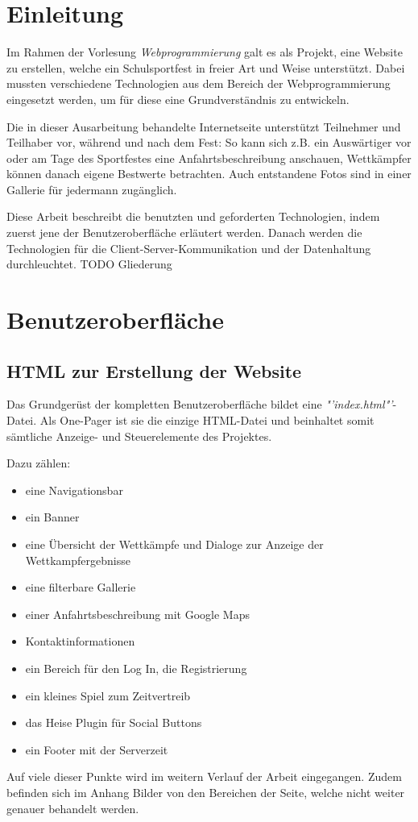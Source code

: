 \chapter{Einleitung}
\label{Einleitung}
Im Rahmen der Vorlesung \textit{Webprogrammierung} galt es als Projekt, eine Website zu erstellen, welche ein Schulsportfest in freier Art und Weise unterstützt. Dabei mussten verschiedene Technologien aus dem Bereich der Webprogrammierung eingesetzt werden, um für diese eine Grundverständnis zu entwickeln.
\par
Die in dieser Ausarbeitung behandelte Internetseite unterstützt Teilnehmer und Teilhaber vor, während und nach dem Fest: So kann sich z.B. ein Auswärtiger vor oder am Tage des Sportfestes eine Anfahrtsbeschreibung anschauen, Wettkämpfer können danach eigene Bestwerte betrachten. Auch entstandene Fotos sind in einer Gallerie für jedermann zugänglich.
\par
Diese Arbeit beschreibt die benutzten und geforderten Technologien, indem zuerst jene der Benutzeroberfläche erläutert werden. Danach werden die Technologien für die Client-Server-Kommunikation und der Datenhaltung durchleuchtet.
TODO Gliederung

\chapter{Benutzeroberfläche}
\label{Benutzeroberfläche}

\section{HTML zur Erstellung der Website}
\label{HTML zur Erstellung der Website}
Das Grundgerüst der kompletten Benutzeroberfläche bildet eine \textit{"'index.html"'}-Datei. Als One-Pager ist sie die einzige HTML-Datei und beinhaltet somit sämtliche Anzeige- und Steuerelemente des Projektes.
\par
Dazu zählen:
\begin{itemize}
	\item eine Navigationsbar
	\item ein Banner
	\item eine Übersicht der Wettkämpfe und Dialoge zur Anzeige der Wettkampfergebnisse
	\item eine filterbare Gallerie
	\item einer Anfahrtsbeschreibung mit Google Maps
	\item Kontaktinformationen
	\item ein Bereich für den Log In, die Registrierung \item ein kleines Spiel zum Zeitvertreib
	\item das Heise Plugin für Social Buttons
	\item ein Footer mit der Serverzeit	
\end{itemize}
Auf viele dieser Punkte wird im weitern Verlauf der Arbeit eingegangen. Zudem befinden sich im Anhang Bilder von den Bereichen der Seite, welche nicht weiter genauer behandelt werden.

